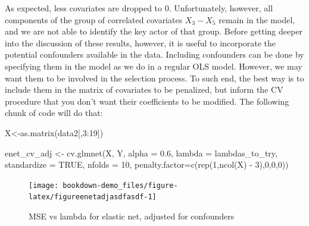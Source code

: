 \documentclass[
]{book}
\newenvironment{Shaded}{\begin{snugshade}}{\end{snugshade}}
\newcommand{\AttributeTok}[1]{\textcolor[rgb]{0.77,0.63,0.00}{#1}}
\newcommand{\ConstantTok}[1]{\textcolor[rgb]{0.00,0.00,0.00}{#1}}
\newcommand{\DecValTok}[1]{\textcolor[rgb]{0.00,0.00,0.81}{#1}}
\newcommand{\FloatTok}[1]{\textcolor[rgb]{0.00,0.00,0.81}{#1}}
\newcommand{\FunctionTok}[1]{\textcolor[rgb]{0.00,0.00,0.00}{#1}}
\newcommand{\NormalTok}[1]{#1}
\newcommand{\OtherTok}[1]{\textcolor[rgb]{0.56,0.35,0.01}{#1}}
\newcommand{\SpecialCharTok}[1]{\textcolor[rgb]{0.00,0.00,0.00}{#1}}
\begin{document}
As expected, less covariates are dropped to 0. Unfortunately, however, all components of the group of correlated covariates \(X_3-X_5\) remain in the model, and we are not able to identify the key actor of that group. Before getting deeper into the discussion of these results, however, it is useful to incorporate the potential confounders available in the data. Including confounders can be done by specifying them in the model as we do in a regular OLS model. However, we may want them to be involved in the selection process. To such end, the best way is to include them in the matrix of covariates to be penalized, but inform the CV procedure that you don't want their coefficients to be modified. The following chunk of code will do that:

\begin{Shaded}
\begin{Highlighting}[]
\NormalTok{X}\OtherTok{\textless{}{-}}\FunctionTok{as.matrix}\NormalTok{(data2[,}\DecValTok{3}\SpecialCharTok{:}\DecValTok{19}\NormalTok{])}

\NormalTok{enet\_cv\_adj }\OtherTok{\textless{}{-}} \FunctionTok{cv.glmnet}\NormalTok{(X, Y, }\AttributeTok{alpha =} \FloatTok{0.6}\NormalTok{, }\AttributeTok{lambda =}\NormalTok{ lambdas\_to\_try,}
                     \AttributeTok{standardize =} \ConstantTok{TRUE}\NormalTok{, }\AttributeTok{nfolds =} \DecValTok{10}\NormalTok{, }\AttributeTok{penalty.factor=}\FunctionTok{c}\NormalTok{(}\FunctionTok{rep}\NormalTok{(}\DecValTok{1}\NormalTok{,}\FunctionTok{ncol}\NormalTok{(X) }\SpecialCharTok{{-}} \DecValTok{3}\NormalTok{),}\DecValTok{0}\NormalTok{,}\DecValTok{0}\NormalTok{,}\DecValTok{0}\NormalTok{))}
\end{Highlighting}
\end{Shaded}

\begin{figure}[H]

{\centering \texttt{[image: bookdown-demo\_files/figure-latex/figureenetadjasdfasdf-1]} 

}

\caption{MSE vs lambda for elastic net, adjusted for confounders}\label{fig:figureenetadjasdfasdf}
\end{figure}

\begin{Shaded}
\end{Shaded}
\end{document}
